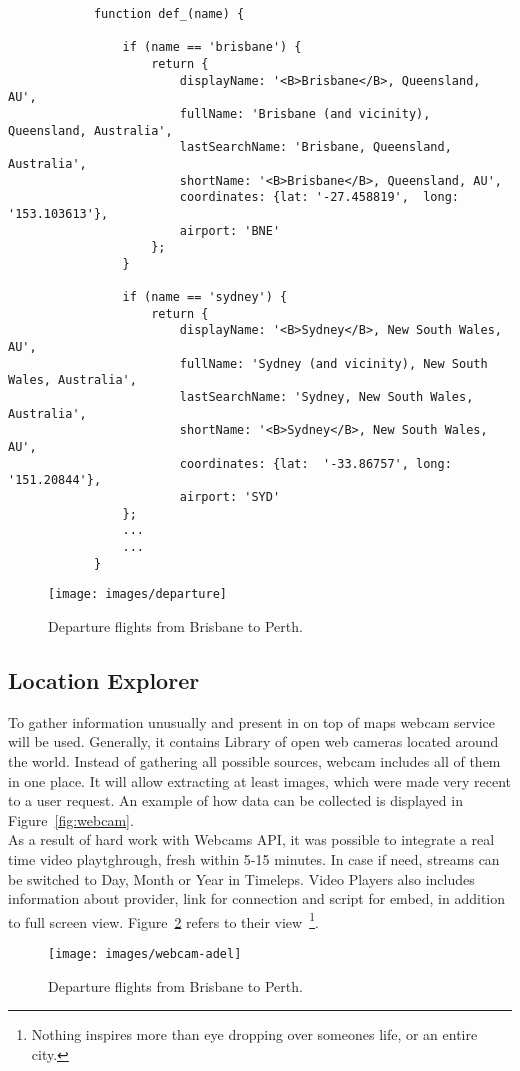\documentclass[12pt]{article}
\numberwithin{equation}{section} %
\numberwithin{figure}{section} %
\numberwithin{table}{section} %
\begin{document}
		\begin{lstlisting}
			function def_(name) {
			
				if (name == 'brisbane') {
					return {
						displayName: '<B>Brisbane</B>, Queensland, AU',
						fullName: 'Brisbane (and vicinity), Queensland, Australia',
						lastSearchName: 'Brisbane, Queensland, Australia',
						shortName: '<B>Brisbane</B>, Queensland, AU',
						coordinates: {lat: '-27.458819',  long: '153.103613'},
						airport: 'BNE'
					};
				}
				
				if (name == 'sydney') {
					return {
						displayName: '<B>Sydney</B>, New South Wales, AU',
						fullName: 'Sydney (and vicinity), New South Wales, Australia',
						lastSearchName: 'Sydney, New South Wales, Australia',
						shortName: '<B>Sydney</B>, New South Wales, AU',
						coordinates: {lat:  '-33.86757', long: '151.20844'},
						airport: 'SYD'
				};
				...
				...
			}
		\end{lstlisting}
		\begin{figure}[H]
			\centering        
			\texttt{[image: images/departure]}
			\caption{Departure flights from Brisbane to Perth.}
			\label{fig:depar}
		\end{figure}
	\subsection{Location Explorer}
		$  $ \\
		
		To gather information unusually and present in on top of maps webcam service will be used. Generally, it contains Library of open web cameras located around the world. Instead of gathering all possible sources, webcam includes all of them in one place. It will allow extracting at least images, which were made very recent to a user request. An example of how data can be collected is displayed in Figure~\ref{fig:webcam}. \\
		
		As a result of hard work with Webcams API, it was possible to integrate a real time video playtghrough, fresh within 5-15 minutes. In case if need, streams can be switched to Day, Month or Year in Timeleps. Video Players also includes information about provider, link for connection and script for embed, in addition to full screen view. Figure~\ref{fig:webCam-adel} refers to their view~\footnote{Nothing inspires more than eye dropping over someones life, or an entire city.}.
		\begin{figure}[H]
			\centering        
			\texttt{[image: images/webcam-adel]}
			\caption{Departure flights from Brisbane to Perth.}
			\label{fig:webCam-adel}
		\end{figure}
\newpage		
\end{document}
